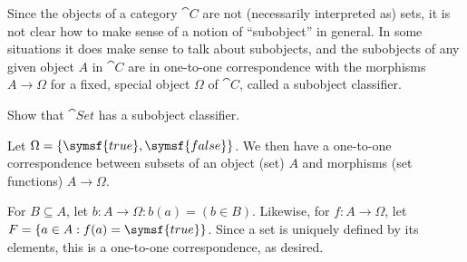 \documentclass[notes,tikz]{agony}
\begin{document}
\begin{xca}
  Since the objects of a category $\cat C$ are not (necessarily interpreted as) sets,
  it is not clear how to make sense of a notion of ``subobject'' in general.
  In some situations it does make sense to talk about subobjects,
  and the subobjects of any given object $A$ in $\cat C$ are in one-to-one correspondence
  with the morphisms $A \to \Omega$ for a fixed, special object $\Omega$ of $\cat C$,
  called a subobject classifier.

  Show that $\cat{Set}$ has a subobject classifier.
\end{xca}
\begin{prf}
  Let $\Omega = \{\symsf{true},\symsf{false}\}$.
  We then have a one-to-one correspondence between subsets of an object (set) $A$
  and morphisms (set functions) $A \to \Omega$.

  For $B \subseteq A$, let $b : A \to \Omega : b(a) = (b \in B)$.
  Likewise, for $f : A \to \Omega$, let $F = {\{a \in A : f(a) = \symsf{true}\}}$.
  Since a set is uniquely defined by its elements,
  this is a one-to-one correspondence, as desired.
\end{prf}
\end{document}
